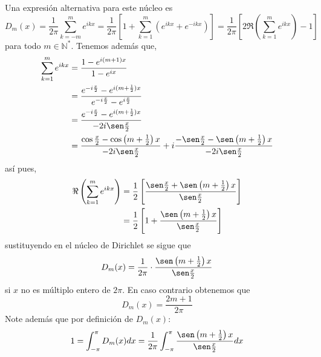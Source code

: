 \documentclass[12pt]{report}
\newcounter{it}
\theoremstyle{largebreak}
\begin{document}
    Una expresión alternativa para este núcleo es
    \begin{equation*}
        D_m(x)=\frac{1}{2\pi}\sum_{ k=-m}^me^{ ikx}=\frac{1}{2\pi}\left[1+\sum_{ k=1}^m\left(e^{ ikx}+e^{ -ikx} \right) \right]=\frac{1}{2\pi}\left[2\Re\left(\sum_{ k=1}^m e^{ ikx} \right)-1 \right]
    \end{equation*}
    para todo $m\in\mathbb{N}^*$. Tenemos además que,
    \begin{equation*}
        \begin{split}
            \sum_{ k=1}^m e^{ ikx}&=\frac{1-e^{ i(m+1)x}}{1-e^{ix}}\\
            &=\frac{e^{ -i\frac{x}{2}}-e^{ i(m+\frac{1}{2})x}}{e^{ -i\frac{x}{2}}-e^{i\frac{x}{2}}}\\
            &=\frac{e^{ -i\frac{x}{2}}-e^{ i(m+\frac{1}{2})x}}{-2i\sen\frac{x}{2}}\\
            &=\frac{\cos\frac{x}{2}-\cos\left(m+\frac{1}{2}\right)x}{-2i\sen\frac{x}{2}}+i\frac{-\sen\frac{x}{2}-\sen\left(m+\frac{1}{2}\right)x}{-2i\sen\frac{x}{2}}\\
        \end{split}
    \end{equation*}
    así pues,
    \begin{equation*}
        \begin{split}
            \Re\left(\sum_{ k=1}^m e^{ ikx} \right)&=\frac{1}{2}\left[\frac{\sen\frac{x}{2}+\sen\left(m+\frac{1}{2} \right)x}{\sen\frac{x}{2}} \right]\\
            &=\frac{1}{2}\left[1+\frac{\sen\left(m+\frac{1}{2} \right)x}{\sen\frac{x}{2}} \right]\\
        \end{split}
    \end{equation*}
    sustituyendo en el núcleo de Dirichlet se sigue que
    \begin{equation*}
        D_m(x)=\frac{1}{2\pi}\cdot\frac{\sen\left(m+\frac{1}{2} \right)x}{\sen\frac{x}{2}}
    \end{equation*}
    si $x$ no es múltiplo entero de $2\pi$. En caso contrario obtenemos que
    \begin{equation*}
        D_m(x)=\frac{2m+1}{2\pi}
    \end{equation*}
    Note además que por definición de $D_m(x)$:
    \begin{equation*}
        1=\int_{-\pi}^\pi D_m(x)dx=\frac{1}{2\pi}\int_{-\pi}^{\pi}\frac{\sen\left(m+\frac{1}{2} \right)x}{\sen\frac{x}{2}}dx
    \end{equation*}
\end{document}
